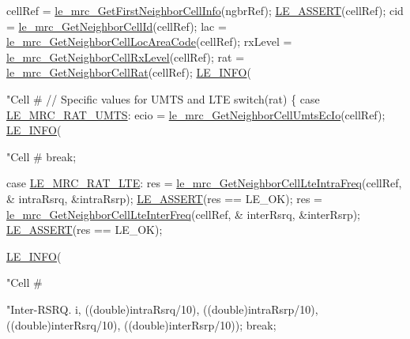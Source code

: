\begin{DoxyCodeInclude}
        cellRef = \hyperlink{le__mrc__interface_8h_ab50724fd74818d71da1dfcd2217dd795}{le\_mrc\_GetFirstNeighborCellInfo}(ngbrRef);
        \hyperlink{le__log_8h_ac0dbbef91dc0fed449d0092ff0557b39}{LE\_ASSERT}(cellRef);
        cid = \hyperlink{le__mrc__interface_8h_abdbc94e474235417d8610e2eb95558eb}{le\_mrc\_GetNeighborCellId}(cellRef);
        lac = \hyperlink{le__mrc__interface_8h_a70ba0ca70367bc673a6bca1e246bb88f}{le\_mrc\_GetNeighborCellLocAreaCode}(cellRef);
        rxLevel = \hyperlink{le__mrc__interface_8h_aeae116235802afd041afd9df009642aa}{le\_mrc\_GetNeighborCellRxLevel}(cellRef);
        rat = \hyperlink{le__mrc__interface_8h_a5bb3e75b74260a9cee57247e1968a31f}{le\_mrc\_GetNeighborCellRat}(cellRef);
        \hyperlink{le__log_8h_a23e6d206faa64f612045d688cdde5808}{LE\_INFO}(\textcolor{stringliteral}{"Cell #%
        \textcolor{comment}{// Specific values for UMTS and LTE}
        \textcolor{keywordflow}{switch}(rat)
        \{
            \textcolor{keywordflow}{case} \hyperlink{le__mrc__interface_8h_aaf23906c37ad59fb96a8a48f7fab5b43afe34c4f3a53aa717f5ecb94dd59bf728}{LE\_MRC\_RAT\_UMTS}:
                ecio = \hyperlink{le__mrc__interface_8h_a94e452e3d7063d3359dcbb97a31b984b}{le\_mrc\_GetNeighborCellUmtsEcIo}(cellRef);
                \hyperlink{le__log_8h_a23e6d206faa64f612045d688cdde5808}{LE\_INFO}(\textcolor{stringliteral}{"Cell #%
                \textcolor{keywordflow}{break};

            \textcolor{keywordflow}{case} \hyperlink{le__mrc__interface_8h_aaf23906c37ad59fb96a8a48f7fab5b43aaf2b25a8ec75f9bacb51967f23247176}{LE\_MRC\_RAT\_LTE}:
                res = \hyperlink{le__mrc__interface_8h_a7754836120c34cd2610b9777bd56409f}{le\_mrc\_GetNeighborCellLteIntraFreq}(cellRef, &
      intraRsrq, &intraRsrp);
                \hyperlink{le__log_8h_ac0dbbef91dc0fed449d0092ff0557b39}{LE\_ASSERT}(res == LE\_OK);
                res = \hyperlink{le__mrc__interface_8h_a331545d4e396c513bba028db981c016b}{le\_mrc\_GetNeighborCellLteInterFreq}(cellRef, &
      interRsrq, &interRsrp);
                \hyperlink{le__log_8h_ac0dbbef91dc0fed449d0092ff0557b39}{LE\_ASSERT}(res == LE\_OK);

                \hyperlink{le__log_8h_a23e6d206faa64f612045d688cdde5808}{LE\_INFO}(\textcolor{stringliteral}{"Cell #%
                        \textcolor{stringliteral}{"Inter-RSRQ.%
                        i, ((\textcolor{keywordtype}{double})intraRsrq/10), ((\textcolor{keywordtype}{double})intraRsrp/10),
                        ((\textcolor{keywordtype}{double})interRsrq/10), ((\textcolor{keywordtype}{double})interRsrp/10));
                \textcolor{keywordflow}{break};

}}}}
\end{DoxyCodeInclude}
